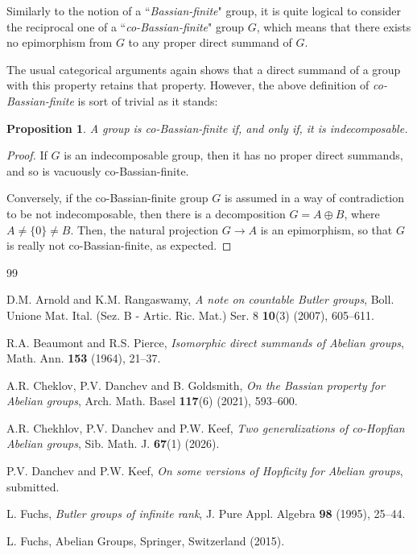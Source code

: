 \documentclass[12pt]{amsart}
\newtheorem{proposition}[theorem]{Proposition}
\theoremstyle{definition}
\begin{document}
Similarly to the notion of a ``{\it Bassian-finite}" group, it is quite logical to consider the reciprocal one of a ``{\it co-Bassian-finite}" group $G$, which means that there exists no epimorphism from $G$ to any proper direct summand of $G$.

\medskip

The usual categorical arguments again shows that a direct summand of a group with this property retains that property. However, the above definition of {\it co-Bassian-finite} is sort of trivial as it stands:

\begin{proposition}
A group is co-Bassian-finite if, and only if, it is indecomposable.
\end{proposition}

\begin{proof}
If $G$ is an indecomposable group, then it has no proper direct summands, and so is vacuously co-Bassian-finite.

Conversely, if the co-Bassian-finite group $G$ is assumed in a way of contradiction to be not indecomposable, then there is a decomposition $G=A\oplus B$, where $A\ne \{0\}\ne B$. Then, the natural projection $G\to A$ is an epimorphism, so that $G$ is really not co-Bassian-finite, as expected.
\end{proof}

\medskip

\begin{thebibliography}{99}

D.M. Arnold and K.M. Rangaswamy, {\it A note on countable Butler groups}, Boll. Unione Mat. Ital. (Sez. B - Artic. Ric. Mat.) Ser. 8 {\bf 10}(3) (2007), 605--611.

R.A. Beaumont and R.S. Pierce, {\it Isomorphic direct summands of Abelian groups}, Math. Ann. {\bf 153} (1964), 21--37.

A.R. Cheklov, P.V. Danchev and B. Goldsmith, {\it On the Bassian property for Abelian groups}, Arch. Math. Basel {\bf 117}(6) (2021), 593--600.

A.R. Chekhlov, P.V. Danchev and P.W. Keef, {\it Two generalizations of co-Hopfian Abelian groups}, Sib. Math. J. {\bf 67}(1) (2026).

P.V. Danchev and P.W. Keef, {\it On some versions of Hopficity for Abelian groups}, submitted.

L. Fuchs, {\it Butler groups of infinite rank}, J. Pure Appl. Algebra {\bf 98} (1995), 25--44.

L. Fuchs, Abelian Groups, Springer, Switzerland (2015).

\end{thebibliography}
\end{document}
